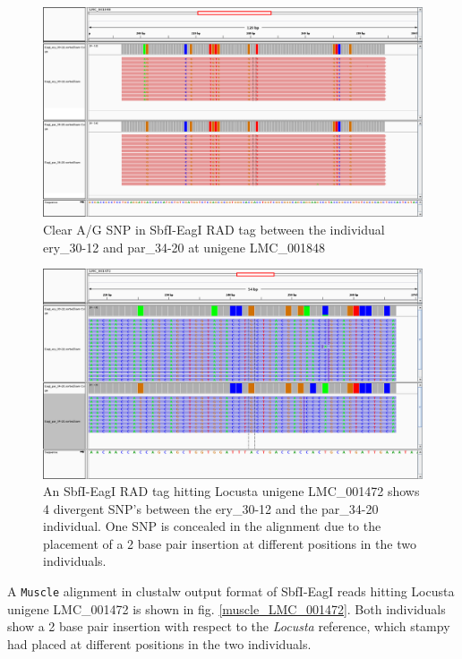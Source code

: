 \documentclass{article}\usepackage[]{graphicx}\usepackage[]{color}
\begin{document}
\begin{figure}
\centering
\includegraphics[width=\textwidth]{./figure/igv_LMC_001848}
\caption{Clear A/G SNP in SbfI-EagI RAD tag between the individual ery\_30-12 and par\_34-20 at unigene LMC\_001848}
\label{igv_LMC_001848}
\end{figure}

\begin{figure}
\centering
\includegraphics[width=\textwidth]{./figure/igv_LMC_001472}
\caption{An SbfI-EagI RAD tag hitting Locusta unigene LMC\_001472 shows 4 divergent SNP's between the ery\_30-12  and the par\_34-20 individual. One SNP is concealed in the alignment due to the placement of a 2 base pair insertion at different positions in the two individuals.}
\label{igv_LMC_001472}
\end{figure}

A \texttt{Muscle} alignment in clustalw output format of SbfI-EagI reads hitting Locusta unigene LMC\_001472 is shown in fig. \ref{muscle_LMC_001472}. Both individuals show a 2 base pair insertion with respect to the \textit{Locusta} reference, which stampy had placed at different positions in the two individuals.
\end{document}
